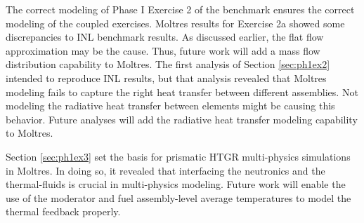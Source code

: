 The correct modeling of Phase I Exercise 2 of the benchmark ensures the correct modeling of the coupled exercises.
Moltres results for Exercise 2a showed some discrepancies to INL benchmark results.
As discussed earlier, the flat flow approximation may be the cause.
Thus, future work will add a mass flow distribution capability to Moltres.
The first analysis of Section \ref{sec:ph1ex2} intended to reproduce INL results, but that analysis revealed that Moltres modeling fails to capture the right heat transfer between different assemblies.
Not modeling the radiative heat transfer between elements might be causing this behavior.
Future analyses will add the radiative heat transfer modeling capability to Moltres.

Section \ref{sec:ph1ex3} set the basis for prismatic HTGR multi-physics simulations in Moltres.
In doing so, it revealed that interfacing the neutronics and the thermal-fluids is crucial in multi-physics modeling.
Future work will enable the use of the moderator and fuel assembly-level average temperatures to model the thermal feedback properly.




